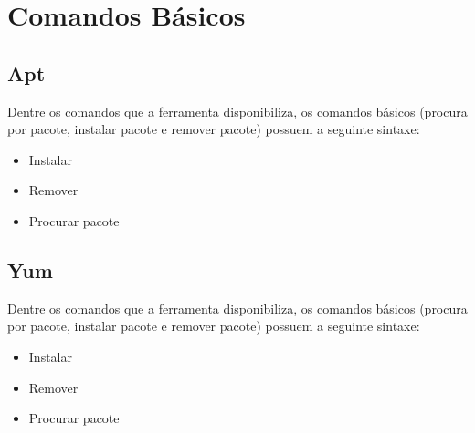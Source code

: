 \section{Comandos Básicos} %
\label{sec:comandos_b_sicos}


\subsection{Apt} %
\label{sub:apt}

Dentre os comandos que a ferramenta disponibiliza, os comandos básicos (procura por pacote, instalar pacote e remover pacote) possuem a seguinte sintaxe:

\begin{itemize}
	\item Instalar
	\item Remover
	\item Procurar pacote
\end{itemize}


\subsection{Yum} %
\label{sub:apt}

Dentre os comandos que a ferramenta disponibiliza, os comandos básicos (procura por pacote, instalar pacote e remover pacote) possuem a seguinte sintaxe:

\begin{itemize}
	\item Instalar
	\item Remover
	\item Procurar pacote
\end{itemize}
